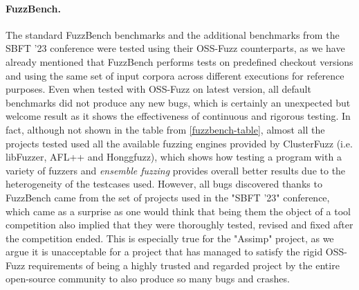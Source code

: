 \paragraph{FuzzBench.} The standard FuzzBench benchmarks and the additional benchmarks from the SBFT '23 conference were tested using their OSS-Fuzz counterparts, as we have already mentioned that FuzzBench performs tests on predefined checkout versions and using the same set of input corpora across different executions for reference purposes. Even when tested with OSS-Fuzz on latest version, all default benchmarks did not produce any new bugs, which is certainly an unexpected but welcome result as it shows the effectiveness of continuous and rigorous testing. In fact, although not shown in the table from \ref{fuzzbench-table}, almost all the projects tested used all the available fuzzing engines provided by ClusterFuzz (i.e. libFuzzer, AFL++ and Honggfuzz), which shows how testing a program with a variety of fuzzers and \textit{ensemble fuzzing} provides overall better results due to the heterogeneity of the testcases used. However, all bugs discovered thanks to FuzzBench came from the set of projects used in the "SBFT '23" conference, which came as a surprise as one would think that being them the object of a tool competition also implied that they were thoroughly tested, revised and fixed after the competition ended. This is especially true for the "Assimp" project, as we argue it is unacceptable for a project that has managed to satisfy the rigid OSS-Fuzz requirements of being a highly trusted and regarded project by the entire open-source community to also produce so many bugs and crashes.


